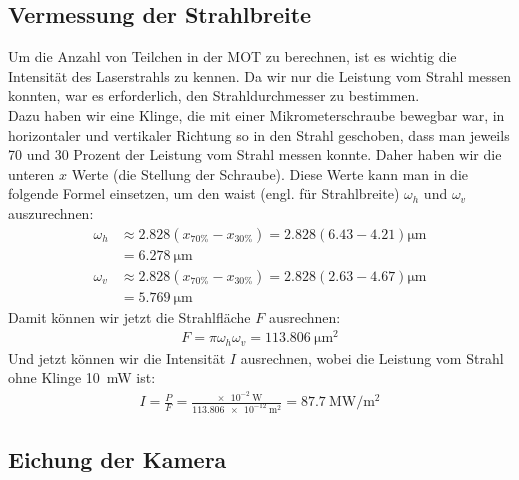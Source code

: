 \documentclass[12pt, a4paper]{article}
\begin{document}
  \subsection{Vermessung der Strahlbreite}
 Um die Anzahl von Teilchen in der MOT zu berechnen, ist es wichtig die Intensität des Laserstrahls zu kennen. Da wir nur die Leistung vom Strahl messen konnten, war es erforderlich, den Strahldurchmesser zu bestimmen.\\
 Dazu haben wir eine Klinge, die mit einer Mikrometerschraube bewegbar war, in horizontaler und vertikaler Richtung so in den Strahl geschoben, dass man jeweils 70 und 30 Prozent der Leistung vom Strahl messen konnte. Daher haben wir die unteren $x$ Werte (die Stellung der Schraube). Diese Werte kann man in die folgende Formel einsetzen, um den waist (engl. für Strahlbreite) $\omega_h$ und $\omega_v$ auszurechnen:
  \begin{align*}
  \omega_h & \approx 2.828(x_{70\%}-x_{30\%})
  =2.828(6.43-4.21) \si{\micro\m}\\
  &=\SI{6.278}{\micro\m}\\
  \omega_v &\approx 2.828(x_{70\%}-x_{30\%})=2.828(2.63-4.67) \si{\micro\m}\\&=\SI{5.769}{\micro\m}
   \end{align*}
   Damit können wir jetzt die Strahlfläche $F$ ausrechnen:
   \begin{align*}
   F=\pi \omega_h \omega_v =\SI{113.806}{\micro\m^2}
   \end{align*}
   Und jetzt können wir die Intensität $I$ ausrechnen, wobei die Leistung vom Strahl ohne Klinge \SI{10} {\mW} ist:
   \begin{align*}
   I=\frac{P}{F}=\frac{\SI{e-2}{\W}}{\SI{113.806e-12}{\m^2}}=\SI{87.7}{\mega\W\per\square\m}
   \end{align*}
  \subsection{Eichung der Kamera}
\end{document}
